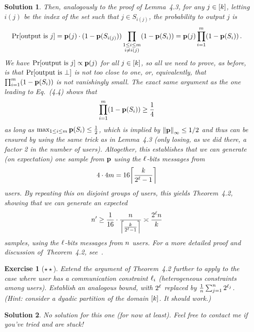 \documentclass[biber,plain]{nowfnt} %
\newtheorem{question}{Exercise}[chapter]
\newtheorem{solution}{Solution}[chapter]
\begin{document}
\begin{solution}
Then, analogously to the proof of Lemma~4.3, for any $j\in[k]$, letting $i(j)$ be the index of the set such that $j\in S_{i(j)}$, the probability to output $j$ is
\[
	\bPr{\text{output is } j } = \p(j)\cdot (1-\p(S_{i(j)})) \prod_{\substack{1\leq i\leq m\\ i\neq i(j)}} (1-\p(S_i)) = \p(j) \prod_{i=1}^m (1-\p(S_i))\,.
\]
We have $\bPr{\text{output is } j }\propto \p(j)$ for all $j\in[k]$, so all we need to prove, as before, is that $\bPr{\text{output is } \bot }$ is not too close to one, or, equivalently, that $\prod_{i=1}^m (1-\mathbf{p}(S_i))$ is not vanishingly small. The exact same argument as the one leading to Eq.~(4.4) shows that 
\[
	\prod_{i=1}^m (1-\mathbf{p}(S_i)) \geq \frac{1}{4}
\]
as long as $\max_{1\leq i\leq m} \mathbf{p}(S_i) \leq \frac{1}{2}$, which is implied by $\norminf{\p} \leq 1/2$ and thus can be ensured by using the same trick as in Lemma~4.3 (only losing, as we did there, a factor 2 in the number of users). Altogether, this establishes that we can generate (on expectation) \emph{one} sample from $\mathbf{p}$ using the $\ell$-bits messages from
\[
		4 \cdot 4m = 16\clg{\frac{\ab}{2^\numbits -1}}
\]
users. By repeating this on disjoint groups of users, this yields Theorem~4.2, showing that we can generate an expected
\[
	\ns' \geq \frac{1}{16}\cdot \frac{\ns}{\clg{\frac{\ab}{2^\numbits -1}}} \asymp \frac{2^\numbits\ns}{\ab}
\]
\iid samples, using the $\ell$-bits messages from $n$ users. For a more detailed proof and discussion of~Theorem~4.2, see~\citet[Theorem~IV.9]{AcharyaCT19b}.
\end{solution}

\begin{question}[$\star\star$]\label{exo:heterogeneous}
Extend the argument of Theorem~4.2 further to apply to the case where user has a communication constraint $\ell_i$ (heterogeneous constraints among users). Establish an analogous bound, with $2^\ell$ replaced by $\frac{1}{n}\sum_{j=1}^n 2^{\ell_j}$. \emph{(Hint: consider a dyadic partition of the domain $[k]$. It \emph{should} work.)}
\end{question}
\begin{solution}\itshape
No solution for this one (for now at least). Feel free to contact me if you've tried and are stuck!
\end{solution}
  
  
\printbibliography
\end{document}
